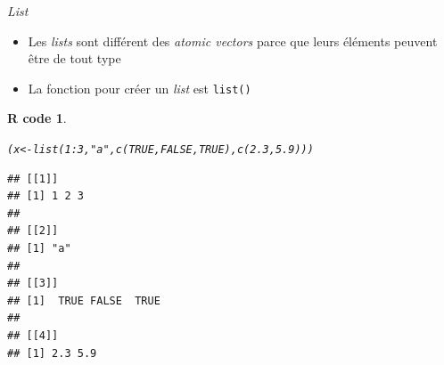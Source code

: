 \documentclass[11pt]{beamer}\usepackage[]{graphicx}\usepackage[]{color}
\makeatletter
\newcommand{\hlnum}[1]{\textcolor[rgb]{0.063,0.58,0.627}{#1}}%
\newcommand{\hlstr}[1]{\textcolor[rgb]{0.063,0.58,0.627}{#1}}%
\newcommand{\hlopt}[1]{\textcolor[rgb]{0.196,0.196,0.196}{#1}}%
\newcommand{\hlstd}[1]{\textcolor[rgb]{0.196,0.196,0.196}{#1}}%
\newcommand{\hlkwb}[1]{\textcolor[rgb]{0.627,0,0.314}{#1}}%
\newcommand{\hlkwd}[1]{\textcolor[rgb]{0.78,0.227,0.412}{#1}}%
\newenvironment{kframe}{%
 \def\at@end@of@kframe{}%
 \ifinner\ifhmode%
  \def\at@end@of@kframe{\end{minipage}}%
  \begin{minipage}{\columnwidth}%
 \fi\fi%
 \def\FrameCommand##1{\hskip\@totalleftmargin \hskip-\fboxsep
 \colorbox{shadecolor}{##1}\hskip-\fboxsep
     \hskip-\linewidth \hskip-\@totalleftmargin \hskip\columnwidth}%
 \MakeFramed {\advance\hsize-\width
   \@totalleftmargin\z@ \linewidth\hsize
   \@setminipage}}%
 {\par\unskip\endMakeFramed%
 \at@end@of@kframe}
\newenvironment{knitrout}{}{} %
\newtheorem{rcode}{R code}[section]
\newcommand{\code}[1]{\texttt{#1}}
\makeatother
\begin{document}
\begin{frame}[fragile]{\textit{List}}

\begin{itemize}
\item Les \textit{lists} sont différent des \textit{atomic vectors} parce que leurs éléments peuvent \^{e}tre de tout type
\item La fonction pour créer un \textit{list} est \code{list()}
\end{itemize}
\pause
\begin{knitrout}\footnotesize
{}\color{fgcolor}\begin{kframe}
\begin{rcode}\label{unnamed-chunk-18}\begin{alltt}
\hlstd{(x} \hlkwb{<-} \hlkwd{list}\hlstd{(}\hlnum{1}\hlopt{:}\hlnum{3}\hlstd{,} \hlstr{"a"}\hlstd{,} \hlkwd{c}\hlstd{(}\hlnum{TRUE}\hlstd{,} \hlnum{FALSE}\hlstd{,} \hlnum{TRUE}\hlstd{),} \hlkwd{c}\hlstd{(}\hlnum{2.3}\hlstd{,} \hlnum{5.9}\hlstd{)))}
\end{alltt}
\begin{verbatim}
## [[1]]
## [1] 1 2 3
## 
## [[2]]
## [1] "a"
## 
## [[3]]
## [1]  TRUE FALSE  TRUE
## 
## [[4]]
## [1] 2.3 5.9
\end{verbatim}
\end{rcode}\end{kframe}
\end{knitrout}

\end{frame}

\end{document}
